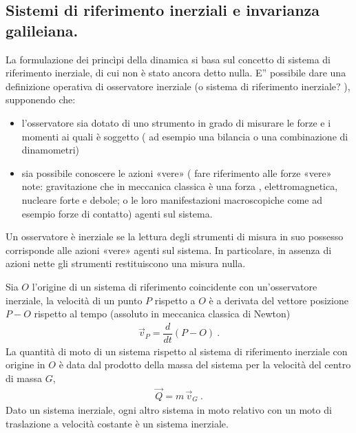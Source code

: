 \documentclass[letterpaper,10pt,italian]{jupyterBook}
\begin{document}
\subsection{Sistemi di riferimento inerziali e invarianza galileiana.}
\label{\detokenize{ch/mechanics/dynamics-principles:sistemi-di-riferimento-inerziali-e-invarianza-galileiana}}
\sphinxAtStartPar
La formulazione dei princìpi della dinamica si basa sul concetto di sistema di riferimento inerziale, di cui non è stato ancora detto nulla.
E” possibile dare una definizione operativa di osservatore inerziale (o sistema di riferimento inerziale? ), supponendo che:
\begin{itemize}
\item {} 
\sphinxAtStartPar
l’osservatore sia dotato di uno strumento in grado di misurare le forze e i momenti ai quali è soggetto ( ad esempio una bilancia o una combinazione di dinamometri)

\item {} 
\sphinxAtStartPar
sia possibile conoscere le azioni «vere» ( fare riferimento alle forze «vere» note: gravitazione \sphinxhyphen{} che in meccanica classica è una forza \sphinxhyphen{}, elettromagnetica, nucleare forte e debole; o le loro manifestazioni macroscopiche come ad esempio forze di contatto) agenti sul sistema.

\end{itemize}

\sphinxAtStartPar
{}
Un osservatore è inerziale se la lettura degli strumenti di misura in suo possesso corrisponde alle azioni «vere» agenti sul sistema. In particolare, in assenza di azioni nette gli strumenti restituiscono una misura nulla.

\sphinxAtStartPar
{}
Sia \(O\) l’origine di un sistema di riferimento coincidente con un’osservatore inerziale, la velocità di un punto \(P\) rispetto a \(O\) è a derivata del vettore posizione \(P - O\) rispetto al tempo (assoluto in meccanica classica di Newton)
\begin{equation*}
\begin{split}\vec{v}_P = \dfrac{d}{dt} (P - O) \ .\end{split}
\end{equation*}
\sphinxAtStartPar
La quantità di moto di un sistema rispetto al sistema di riferimento inerziale con origine in \(O\) è data dal prodotto della massa del sistema per la velocità del centro di massa \(G\),
\begin{equation*}
\begin{split}\vec{Q} = m \, \vec{v}_G \ .\end{split}
\end{equation*}
\sphinxAtStartPar
{}
Dato un sistema inerziale, ogni altro sistema in moto relativo con un moto di traslazione a velocità costante è un sistema inerziale.
\end{document}
